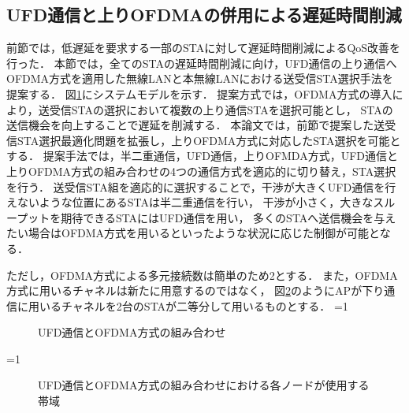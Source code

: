 \documentclass[master]{kuisthesis}		%
\newcounter{flagFig}
\begin{document}
		\subsection{UFD通信と上りOFDMAの併用による遅延時間削減}\label{sec:ufd_ofdma}
			前節では，低遅延を要求する一部のSTAに対して遅延時間削減によるQoS改善を行った．
			本節では，全てのSTAの遅延時間削減に向け，UFD通信の上り通信へOFDMA方式を適用した無線LANと本無線LANにおける送受信STA選択手法を提案する．
			図\ref{fig:ofdma}にシステムモデルを示す．
			提案方式では，OFDMA方式の導入により，送受信STAの選択において複数の上り通信STAを選択可能とし，
			STAの送信機会を向上することで遅延を削減する．
			本論文では，前節で提案した送受信STA選択最適化問題を拡張し，上りOFDMA方式に対応したSTA選択を可能とする．
			提案手法では，半二重通信，UFD通信，上りOFMDA方式，UFD通信と上りOFDMA方式の組み合わせの4つの通信方式を適応的に切り替え，STA選択を行う．
			送受信STA組を適応的に選択することで，干渉が大きくUFD通信を行えないような位置にあるSTAは半二重通信を行い，
			干渉が小さく，大きなスループットを期待できるSTAにはUFD通信を用い，
			多くのSTAへ送信機会を与えたい場合はOFDMA方式を用いるといったような状況に応じた制御が可能となる．
			\par
			ただし，OFDMA方式による多元接続数は簡単のため2とする．
			また，OFDMA方式に用いるチャネルは新たに用意するのではなく，
			図\ref{fig:ufd_ofdma_channel}のようにAPが下り通信に用いるチャネルを2台のSTAが二等分して用いるものとする．
			\ifnum\value{flagFig}=1 {\begin{figure}[htbp]
				\centering
				\caption{UFD通信とOFDMA方式の組み合わせ}
				\label{fig:ofdma}
			\end{figure}}\fi
			\ifnum\value{flagFig}=1 {\begin{figure}[htbp]
				\centering
				\caption{UFD通信とOFDMA方式の組み合わせにおける各ノードが使用する帯域}
				\label{fig:ufd_ofdma_channel}
			\end{figure}}\fi
\end{document}
